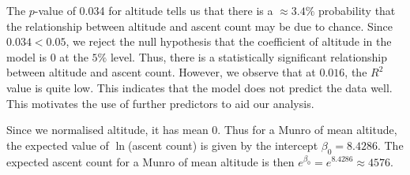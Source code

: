 \documentclass[11pt,a4paper]{article}
\begin{document}
The $p$-value of 0.034 for altitude tells us that there is a $\approx 3.4\%$ probability that the relationship between altitude and ascent count may be due to chance. Since $0.034 < 0.05$, we reject the null hypothesis that the coefficient of altitude in the model is 0 at the $5\%$ level. Thus, there is a statistically significant relationship between altitude and ascent count. However, we observe that at $0.016$, the $R^{2}$ value is quite low. This indicates that the model does not predict the data well. This motivates the use of further predictors to aid our analysis.

Since we normalised altitude, it has mean 0. Thus for a Munro of mean altitude, the expected value of $\ln$(ascent count) is given by the intercept $\beta_0=8.4286$. The expected ascent count for a Munro of mean altitude is then $e^{\beta_0}=e^{8.4286}\approx 4576$. 
\end{document}

